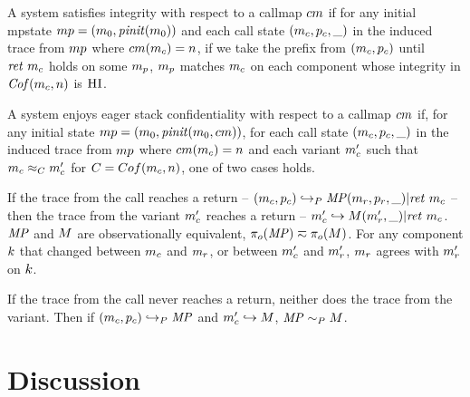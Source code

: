 \documentclass[acmsmall,review,anonymous]{acmart}\settopmatter{printfolios=true,printccs=false,printacmref=false}
\begin{document}


A system satisfies integrity with respect to a callmap \(cm\)
if for any initial mpstate \(mp =
(m_0,\mathit{pinit}(m_0))\) and each call state
\((m_c,p_c,\_)\) in the induced trace from \(mp\)
where \(cm(m_c) = n\), if we take the prefix from
\((m_c,p_c)\) until \(\mathit{ret}\ m_c\) holds on some
\(m_p\), \(m_p\) matches \(m_c\) on each component whose integrity
in \(\mathit{Cof}(m_c,n)\) is \(\textsc{HI}\).


A system enjoys eager stack confidentiality with respect to a callmap
\(cm\) if, for any initial state \(mp =
(m_0,\mathit{pinit}(m_0,cm))\), for each call state
\((m_c,p_c,\_)\) in the induced trace from \(mp\)
where \(cm(m_c) = n\) and each variant \(m_c'\) such that
\(m_c \approx_C m_c'\) for \(C = Cof(m_c, n)\),
one of two cases holds.

If the trace from the call reaches a return -- \((m_c,p_c)
\hookrightarrow_P \mathit{MP} (m_r,p_r,\_) | \mathit{ret}\ m_c\) --
then the trace from the variant \(m_c'\) reaches a return --
\(m_c' \hookrightarrow M (m_r',\_) | \mathit{ret}\ m_c\).
\(\mathit{MP}\) and \(M\) are observationally equivalent, \(\pi_o(\mathit{MP}) \eqsim
\pi_o(M)\). For any component \(k\) that changed between
\(m_c\) and \(m_r\), or between \(m_c'\) and \(m_r'\),
\(m_r\) agrees with \(m_r'\) on \(k\).

If the trace from the call never reaches a return, neither does the
trace from the variant. Then if \((m_c,p_c) \hookrightarrow_P
\mathit{MP}\) and \(m_c' \hookrightarrow M\), \(\mathit{MP} \sim_P M\).


\section{Discussion}
\end{document}
